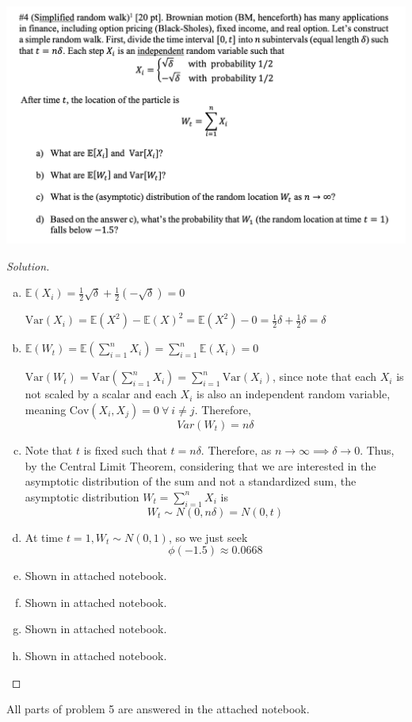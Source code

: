 \documentclass[12pt]{scrartcl}
\newcommand{\E}{\mathbb{E}}
\newcommand{\V}{\text{Var}}
\newcommand{\Cov}{\text{Cov}}
\begin{document}
\newpage

\includegraphics[width=15cm]{41.png}

\begin{proof}[Solution]
  
\hfill

\begin{enumerate}[a.]
\item $\E(X_i) = \frac{1}{2}\sqrt{\delta} + \frac{1}{2}(-\sqrt{\delta}) = 0$

$\V(X_i) = \E(X^2) - \E(X)^2 = \E(X^2) - 0 = \frac{1}{2}\delta + \frac{1}{2}\delta = \delta$

\item $\E(W_t) = \E(\sum_{i=1}^n X_i) = \sum_{i=1}^n \E(X_i) = 0$

$\V(W_t) = \V(\sum_{i=1}^n X_i) = \sum_{i=1}^n \V(X_i)$, since note that each $X_i$ is not scaled by a 
scalar and each $X_i$ is also an independent random variable, meaning $\Cov(X_i, X_j) = 0 \ \forall \ i \neq j$. 
Therefore, 
\[Var(W_t) = n\delta\]

\item Note that $t$ is fixed such that $t = n\delta$. Therefore, as $n\to\infty \implies \delta \to 0$. Thus, 
by the Central Limit Theorem, considering that we are interested in the asymptotic distribution 
of the sum and not a standardized sum, the asymptotic distribution $W_t = \sum_{i=1}^n X_i$ is 
\[W_t \sim N(0, n\delta) = N(0, t)\] 

\item At time $t=1, W_t \sim N(0, 1)$, so we just seek 
\[\phi(-1.5) \approx 0.0668\]

\item Shown in attached notebook.
\item Shown in attached notebook.
\item Shown in attached notebook.
\item Shown in attached notebook.
\end{enumerate}

\end{proof}

\newpage

All parts of problem 5 are answered in the attached notebook.
\end{document}
